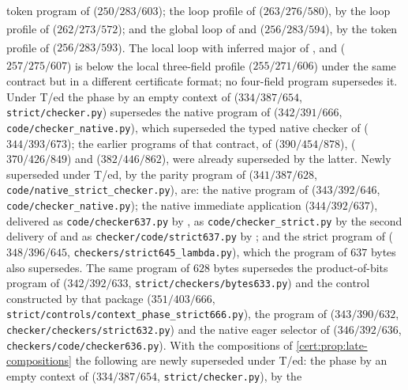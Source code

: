 token program of  ($250/283/603$\textsuperscript{\dag});
the loop profile of 
($263/276/580$\textsuperscript{\dag}), by the loop profile of
 ($262/273/572$\textsuperscript{\dag}); and the global
loop of  and 
($256/283/594$\textsuperscript{\dag}), by the token profile of
 ($256/283/593$\textsuperscript{\dag}). The local loop
with inferred major of ,  and
 ($257/275/607$\textsuperscript{\dag}) is below the
local three-field profile ($255/271/606$\textsuperscript{\dag}) under the same
contract but in a different certificate format; no four-field program
supersedes it. Under T/ed the phase by an empty context of
 ($334/387/654$, \texttt{strict/checker.py})
supersedes the native program of  ($342/391/666$,
\texttt{code/checker\_native.py}), which superseded the typed native checker
of  ($344/393/673$); the earlier programs of that
contract, of  ($390/454/878$),
 ($370/426/849$) and 
($382/446/862$), were already superseded by the latter. Newly superseded under
T/ed, by the parity program of  ($341/387/628$,
\texttt{code/native\_strict\_checker.py}), are: the native program of
 ($343/392/646$, \texttt{code/checker\_native.py});
the native immediate application ($344/392/637$), delivered as
\texttt{code/checker637.py} by , as
\texttt{code/checker\_strict.py} by the second delivery of
 and as \texttt{checker/code/strict637.py} by
; and the strict program of 
($348/396/645$, \texttt{checkers/strict645\_lambda.py}), which the program of
$637$ bytes also supersedes. The same program of $628$ bytes supersedes the
product-of-bits program of  ($342/392/633$,
\texttt{strict/checkers/bytes633.py}) and the control constructed by that
package ($351/403/666$, \texttt{strict/controls/context\_phase\_strict666.py}),
the program of  ($343/390/632$,
\texttt{checker/checkers/strict632.py}) and the native eager selector of
 ($346/392/636$, \texttt{checkers/code/checker636.py}).
With the compositions of \cref{cert:prop:late-compositions} the following are
newly superseded under T/ed: the phase by an empty context of
 ($334/387/654$, \texttt{strict/checker.py}), by the
